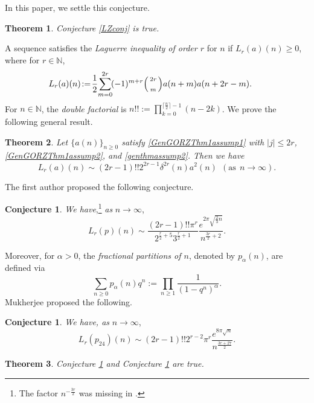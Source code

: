 \documentclass[11pt,reqno,a4paper]{amsart}
\renewcommand{\a}{\alpha}
\renewcommand{\d}{{\delta}}
\renewcommand{\(}{\left\(}
\renewcommand{\)}{\right\)}
\numberwithin{equation}{section}
\theoremstyle{plain}
\newtheorem{theorem}{Theorem}[section]
\theoremstyle{definition} %
\newcounter{specialstatement}
\newtheorem{conjecture}[specialstatement]{Conjecture}
\numberwithin{equation}{section}
\renewcommand{\binom}[2]{\left(\begin{smallmatrix}#1\\\\#2\end{smallmatrix}\right)}
\begin{document}
In this paper, we settle this conjecture.

\begin{theorem}\label{Briggsptnoverptnk}
Conjecture \ref{LZconj} is true. 
\end{theorem}

A sequence satisfies the {\it Laguerre inequality of order $r$} for $n$ if $L_r(a)(n)\geq0$, where for $r\in\mathbb{N}$,
\begin{align}\label{Lagineq}
\hspace{-0.2 cm}L_r(a)(n)\!&:=\!\frac 12\!\sum_{m=0}^{2r}\!(-1)^{m+r}\!\binom{2r}{m}\!a(n+m)a(n+2r-m).%
\end{align}
For $n\!\in\!\mathbb{N}$, the {\it double factorial} is $n!!:=\prod_{k=0}^{\lceil\frac n2\rceil-1}(n-2k)$. We prove the following general result. 
\begin{theorem}\label{newlem1}
 Let $\{a(n)\}_{n\ge 0}$ satisfy {\rm{\ref{GenGORZThm1assump1}}} with $|j|\le 2r$, {\rm{\ref{GenGORZThm1assump2}}}, and {\rm{\ref{genthmassump2}}}. Then we have 
	\[
	L_r(a)(n)\sim (2r-1)!!2^{2r-1} \d^{2r}(n)a^2(n)
	\ \ (\text{as}\ \ n\rightarrow\infty).
	\]
\end{theorem}
 The first author \cite[p. 28]{Ban} proposed the following conjecture. 
\begin{conjecture}\label{Banconj}
{\it We have},\footnote{The factor $n^{-\frac{3r}{2}}$ was missing in \cite{Ban}.} {\it as} $n\to \infty$,
\[
L_r(p)(n)\sim \frac{(2r-1)!!\pi^r }{2^{\frac r2+5} 3^{\frac r2+1}}\frac{e^{2\pi\sqrt{\frac{2}3 n}}}{n^{\frac{3r}{2}+2}}.
\]
\end{conjecture} 
Moreover, for $\a>0$, the {\it fractional partitions of $n$}, denoted by $p_{\a}(n)$, are defined via 
\begin{equation*}
\sum_{n\geq0} p_{\a}(n)q^n:=\prod_{n\geq1}\frac{1}{\left(1-q^n\right)^{\a}}.
\end{equation*}
Mukherjee \cite[Conjecture 1.6]{M} proposed the following. 
\begin{conjecture}\label{Mconj1}
{\it We have, as} $n\to \infty$,
\[
L_r\left(p_{24}\right)(n)\sim (2r-1)!!2^{r-2}\pi^r\frac{e^{8\pi\sqrt n}}{n^{\frac{3r+27}2}}.
\]	
\end{conjecture}


\begin{theorem}\label{ex1}
Conjecture \ref{Banconj} and Conjecture \ref{Mconj1} are true.
\end{theorem}
\end{document}
